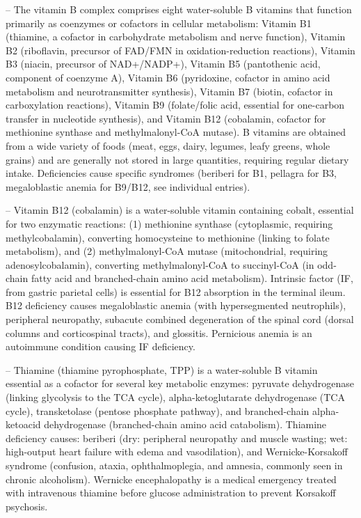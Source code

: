 -- The vitamin B complex comprises eight water-soluble B vitamins that function primarily as coenzymes or cofactors in cellular metabolism: Vitamin B1 (thiamine, a cofactor in carbohydrate metabolism and nerve function), Vitamin B2 (riboflavin, precursor of FAD/FMN in oxidation-reduction reactions), Vitamin B3 (niacin, precursor of NAD+/NADP+), Vitamin B5 (pantothenic acid, component of coenzyme A), Vitamin B6 (pyridoxine, cofactor in amino acid metabolism and neurotransmitter synthesis), Vitamin B7 (biotin, cofactor in carboxylation reactions), Vitamin B9 (folate/folic acid, essential for one-carbon transfer in nucleotide synthesis), and Vitamin B12 (cobalamin, cofactor for methionine synthase and methylmalonyl-CoA mutase). B vitamins are obtained from a wide variety of foods (meat, eggs, dairy, legumes, leafy greens, whole grains) and are generally not stored in large quantities, requiring regular dietary intake. Deficiencies cause specific syndromes (beriberi for B1, pellagra for B3, megaloblastic anemia for B9/B12, see individual entries).

-- Vitamin B12 (cobalamin) is a water-soluble vitamin containing cobalt, essential for two enzymatic reactions: (1) methionine synthase (cytoplasmic, requiring methylcobalamin), converting homocysteine to methionine (linking to folate metabolism), and (2) methylmalonyl-CoA mutase (mitochondrial, requiring adenosylcobalamin), converting methylmalonyl-CoA to succinyl-CoA (in odd-chain fatty acid and branched-chain amino acid metabolism). Intrinsic factor (IF, from gastric parietal cells) is essential for B12 absorption in the terminal ileum. B12 deficiency causes megaloblastic anemia (with hypersegmented neutrophils), peripheral neuropathy, subacute combined degeneration of the spinal cord (dorsal columns and corticospinal tracts), and glossitis. Pernicious anemia is an autoimmune condition causing IF deficiency.

-- Thiamine (thiamine pyrophosphate, TPP) is a water-soluble B vitamin essential as a cofactor for several key metabolic enzymes: pyruvate dehydrogenase (linking glycolysis to the TCA cycle), alpha-ketoglutarate dehydrogenase (TCA cycle), transketolase (pentose phosphate pathway), and branched-chain alpha-ketoacid dehydrogenase (branched-chain amino acid catabolism). Thiamine deficiency causes: beriberi (dry: peripheral neuropathy and muscle wasting; wet: high-output heart failure with edema and vasodilation), and Wernicke-Korsakoff syndrome (confusion, ataxia, ophthalmoplegia, and amnesia, commonly seen in chronic alcoholism). Wernicke encephalopathy is a medical emergency treated with intravenous thiamine before glucose administration to prevent Korsakoff psychosis.

